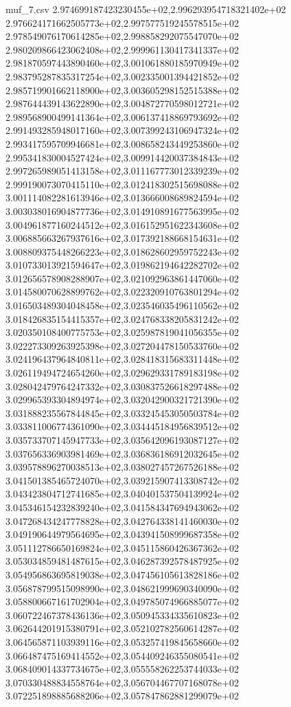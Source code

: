 \begin{filecontents*}{muf_7.csv}
2.974699187423230455e+02,2.996293954718321402e+02
2.976624171662505773e+02,2.997577519245578515e+02
2.978549076170614285e+02,2.998858292075547070e+02
2.980209866423062408e+02,2.999961130417341337e+02
2.981870597443890460e+02,3.001061880185970949e+02
2.983795287835317254e+02,3.002335001394421852e+02
2.985719901662118900e+02,3.003605298152515388e+02
2.987644439143622890e+02,3.004872770598012721e+02
2.989568900499141364e+02,3.006137418869793692e+02
2.991493285948017160e+02,3.007399243106947324e+02
2.993417595709946681e+02,3.008658243449253860e+02
2.995341830004527424e+02,3.009914420037384843e+02
2.997265989051413158e+02,3.011167773012339239e+02
2.999190073070415110e+02,3.012418302515698088e+02
3.001114082281613946e+02,3.013666008689824594e+02
3.003038016904877736e+02,3.014910891677563995e+02
3.004961877160244512e+02,3.016152951622343608e+02
3.006885663267937616e+02,3.017392188668154631e+02
3.008809375448266223e+02,3.018628602959752243e+02
3.010733013921594647e+02,3.019862194642282702e+02
3.012656578908288907e+02,3.021092963861447060e+02
3.014580070628899762e+02,3.022320910763801294e+02
3.016503489304048458e+02,3.023546035496110562e+02
3.018426835154415357e+02,3.024768338205831242e+02
3.020350108400775753e+02,3.025987819041056355e+02
3.022273309263925398e+02,3.027204478150533760e+02
3.024196437964840811e+02,3.028418315683311448e+02
3.026119494724654260e+02,3.029629331789183198e+02
3.028042479764247332e+02,3.030837526618297488e+02
3.029965393304894974e+02,3.032042900321721390e+02
3.031888235567844845e+02,3.033245453050503784e+02
3.033811006774361090e+02,3.034445184956839512e+02
3.035733707145947733e+02,3.035642096193087127e+02
3.037656336903981469e+02,3.036836186912032645e+02
3.039578896270038513e+02,3.038027457267526188e+02
3.041501385465724070e+02,3.039215907413308742e+02
3.043423804712741685e+02,3.040401537504139924e+02
3.045346154232839240e+02,3.041584347694943062e+02
3.047268434247778828e+02,3.042764338141460030e+02
3.049190644979564695e+02,3.043941508999687358e+02
3.051112786650169824e+02,3.045115860426367362e+02
3.053034859481487615e+02,3.046287392578487925e+02
3.054956863695819038e+02,3.047456105613828186e+02
3.056878799515098990e+02,3.048621999690340090e+02
3.058800667161702904e+02,3.049785074966885077e+02
3.060722467378436136e+02,3.050945334335610823e+02
3.062644201915380791e+02,3.052102782560614287e+02
3.064565871103939116e+02,3.053257419845658660e+02
3.066487475169414552e+02,3.054409246355080541e+02
3.068409014337734675e+02,3.055558262253744033e+02
3.070330488834558764e+02,3.056704467707168078e+02
3.072251898885688206e+02,3.057847862881299079e+02

\end{filecontents*}

